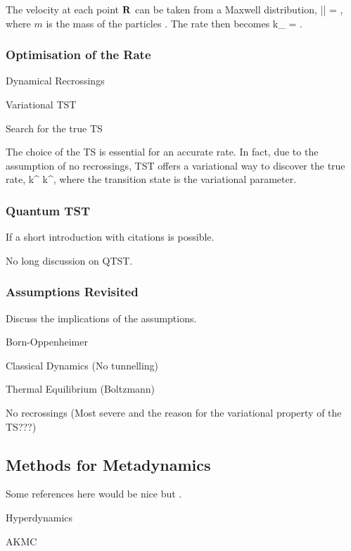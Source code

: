 The velocity at each point ${\mathrm{\mathbf{\bm{R}}}}$ can be taken from a Maxwell distribution, 
\langle || \rangle = ,
\eeq
where $m$ is the mass of the particles .
The rate then becomes
k_ =  . \quad \text{\expand}
\eeq

\placeholder

\subsubsection{Optimisation of the Rate}
\bit
\item Dynamical Recrossings
\item Variational TST
\item Search for the true TS
\eit

The choice of the TS is essential for an accurate rate.
In fact, due to the assumption of no recrossings, TST offers a variational way to discover the true rate,
k^ \ge k^,
\eeq
where the transition state is the variational parameter.

\subsubsection{Quantum TST}
\bit
\item If a short introduction with citations is possible.
\item No long discussion on QTST.
\eit

\subsubsection{Assumptions Revisited}
Discuss the implications of the assumptions.
\bit
\item Born-Oppenheimer
\item Classical Dynamics (No tunnelling)
\item Thermal Equilibrium (Boltzmann)
\item No recrossings (Most severe and the reason for the variational property of the TS???)
\eit
\placeholder

%

\subsection{Methods for Metadynamics}
\bit
\item Some references here would be nice but .
\item Hyperdynamics
\item AKMC
\eit
\placeholder

